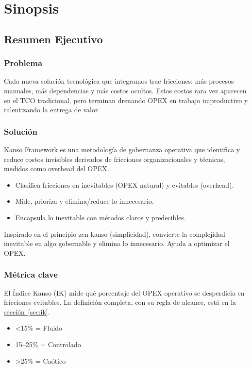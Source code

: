 \chapter{Sinopsis}\label{chap:aa}

\section{Resumen Ejecutivo}

\subsection*{Problema}
Cada nueva solución tecnológica que integramos trae fricciones: más procesos manuales, más dependencias y más costos ocultos. Estos costos rara vez aparecen en el TCO tradicional, pero terminan drenando OPEX en trabajo improductivo y ralentizando la entrega de valor.

\subsection*{Solución}
Kanso Framework es una metodología de gobernanza operativa que identifica y reduce costos invisibles derivados de fricciones organizacionales y técnicas, medidos como overhead del OPEX.

\begin{itemize}
    \item Clasifica fricciones en inevitables (OPEX natural) y evitables (overhead).
    \item Mide, prioriza y elimina/reduce lo innecesario.
    \item Encapsula lo inevitable con métodos claros y predecibles.
\end{itemize}

Inspirado en el principio zen kanso (simplicidad), convierte la complejidad inevitable en algo gobernable y elimina lo innecesario. Ayuda a optimizar el OPEX.

\subsection*{Métrica clave}
El Índice Kanso (IK) mide qué porcentaje del OPEX operativo se desperdicia en fricciones
evitables. La definición completa, con su regla de alcance, está en la \hyperref[sec:ik]{sección~\ref{sec:ik}}.

\begin{itemize}
    \item <15\% = Fluido
    \item 15--25\% = Controlado
    \item >25\% = Caótico 
\end{itemize}

